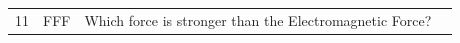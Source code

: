 \documentclass[10pt]{article}
\begin{document}
\begin{tiny}
\begin{longtable}{|r|p{0.375in}|p{1.275in}|p{3.5in}|}
11 &          FFF &                                                                                                                                                                                                                          Which force is stronger than the Electromagnetic Force? &                                                                                                                                                                                                                                                                                                                                                                                                                                                                                                                                                                                                                                                                                                                                                                                                                                                                                                                                                                                                                                                                                                                                                                                                                                                                                                                                                                                                                                                                                                                                                                                                                                                                                                                                                                                                                                                                                                                                                                                                                                                                                                                                                                                                                                                                                                                                                                                                                                                                                                                                                                                                                                                                                                                                                                                                                                                                                                                                                                                                                                                                                               
\end{longtable}
\end{tiny}
\end{document}
